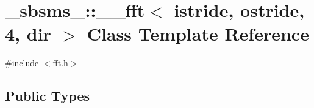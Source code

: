 \hypertarget{class__sbsms___1_1____fft_3_01istride_00_01ostride_00_014_00_01dir_01_4}{}\section{\+\_\+sbsms\+\_\+\+:\+:\+\_\+\+\_\+fft$<$ istride, ostride, 4, dir $>$ Class Template Reference}
\label{class__sbsms___1_1____fft_3_01istride_00_01ostride_00_014_00_01dir_01_4}


{\ttfamily \#include $<$fft.\+h$>$}

\subsection*{Public Types}
